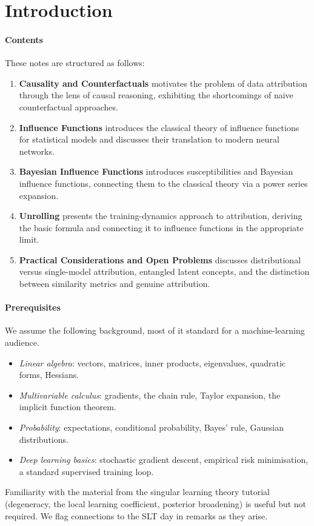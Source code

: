 \section*{Introduction}


\paragraph{Contents} These notes are structured as follows:

\begin{enumerate}[label=\arabic*.]
  \item \textbf{Causality and Counterfactuals} motivates the problem of data attribution through the lens of causal reasoning, exhibiting the shortcomings of naive counterfactual approaches.
  \item \textbf{Influence Functions} introduces the classical theory of influence functions for statistical models and discusses their translation to modern neural networks.
  \item \textbf{Bayesian Influence Functions} introduces susceptibilities and Bayesian influence functions, connecting them to the classical theory via a power series expansion.
  \item \textbf{Unrolling} presents the training-dynamics approach to attribution, deriving the basic formula and connecting it to influence functions in the appropriate limit.
  \item \textbf{Practical Considerations and Open Problems} discusses distributional versus single-model attribution, entangled latent concepts, and the distinction between similarity metrics and genuine attribution.
\end{enumerate}

\paragraph{Prerequisites} We assume the following background, most of it standard for a machine-learning audience.
\begin{itemize}
  \item \emph{Linear algebra}: vectors, matrices, inner products, eigenvalues, quadratic forms, Hessians.
  \item \emph{Multivariable calculus}: gradients, the chain rule, Taylor expansion, the implicit function theorem.
  \item \emph{Probability}: expectations, conditional probability, Bayes' rule, Gaussian distributions.
  \item \emph{Deep learning basics}: stochastic gradient descent, empirical risk minimisation, a standard supervised training loop.
\end{itemize}
Familiarity with the material from the singular learning theory tutorial (degeneracy, the local learning coefficient, posterior broadening) is useful but not required. We flag connections to the SLT day in remarks as they arise.

